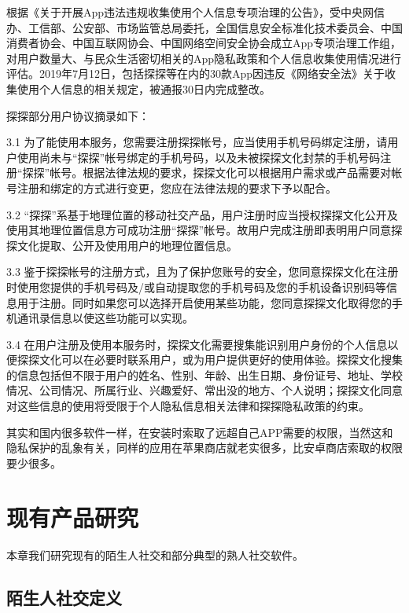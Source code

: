 \documentclass[UTF8]{ctexart}
\begin{document}
根据《关于开展App违法违规收集使用个人信息专项治理的公告》，受中央网信办、工信部、公安部、市场监管总局委托，全国信息安全标准化技术委员会、中国消费者协会、中国互联网协会、中国网络空间安全协会成立App专项治理工作组，对用户数量大、与民众生活密切相关的App隐私政策和个人信息收集使用情况进行评估。2019年7月12日，包括探探等在内的30款App因违反《网络安全法》关于收集使用个人信息的相关规定，被通报30日内完成整改。\cite{Privacy}

探探部分用户协议摘录如下：

\begin{tcolorbox}
    3.1 为了能使用本服务，您需要注册探探帐号，应当使用手机号码绑定注册，请用户使用尚未与“探探”帐号绑定的手机号码，以及未被探探文化封禁的手机号码注册“探探”帐号。根据法律法规的要求，探探文化可以根据用户需求或产品需要对帐号注册和绑定的方式进行变更，您应在法律法规的要求下予以配合。

    3.2 “探探”系基于地理位置的移动社交产品，用户注册时应当授权探探文化公开及使用其地理位置信息方可成功注册“探探”帐号。故用户完成注册即表明用户同意探探文化提取、公开及使用用户的地理位置信息。

    3.3 鉴于探探帐号的注册方式，且为了保护您账号的安全，您同意探探文化在注册时使用您提供的手机号码及/或自动提取您的手机号码及您的手机设备识别码等信息用于注册。同时如果您可以选择开启使用某些功能，您同意探探文化取得您的手机通讯录信息以使这些功能可以实现。

    3.4 在用户注册及使用本服务时，探探文化需要搜集能识别用户身份的个人信息以便探探文化可以在必要时联系用户，或为用户提供更好的使用体验。探探文化搜集的信息包括但不限于用户的姓名、性别、年龄、出生日期、身份证号、地址、学校情况、公司情况、所属行业、兴趣爱好、常出没的地方、个人说明；探探文化同意对这些信息的使用将受限于个人隐私信息相关法律和探探隐私政策的约束。\cite{MoMoAgreement}
\end{tcolorbox}

其实和国内很多软件一样，在安装时索取了远超自己APP需要的权限，当然这和隐私保护的乱象有关，同样的应用在苹果商店就老实很多，比安卓商店索取的权限要少很多。

\section{现有产品研究}
本章我们研究现有的陌生人社交和部分典型的熟人社交软件。

\subsection{陌生人社交定义}
\end{document}
